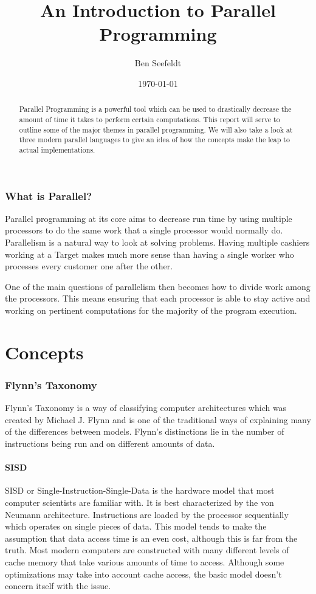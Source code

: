 \documentclass{article}
\author{Ben Seefeldt}
\title{An Introduction to Parallel Programming \\
		\small{\ver}}
\date{\today}
\begin{document}
\maketitle

\begin{abstract}
Parallel Programming is a powerful tool which can be used to drastically decrease the amount of time it takes to perform certain computations. This report will serve to outline some of the major themes in parallel programming. We will also take a look at three modern parallel languages to give an idea of how the concepts make the leap to actual implementations. 
\end{abstract}

  \section{What is Parallel?}
  Parallel programming at its core aims to decrease run time by using multiple processors to do the same work that a single processor would normally do. Parallelism is a natural way to look at solving problems. Having multiple cashiers working at a Target makes much more sense than having a single worker who processes every customer one after the other.
  
  One of the main questions of parallelism then becomes how to divide work among the processors. This means ensuring that each processor is able to stay active and working on pertinent computations for the majority of the program execution.

\part{Concepts}

  \section{Flynn's Taxonomy}
  Flynn's Taxonomy is a way of classifying computer architectures which was created by Michael J. Flynn and is one of the traditional ways of explaining many of the differences between models. Flynn's distinctions lie in the number of instructions being run and on different amounts of data.
    \subsection{SISD}
    SISD or Single-Instruction-Single-Data is the hardware model that most computer scientists are familiar with. It is best characterized by the von Neumann architecture. Instructions are loaded by the processor sequentially which operates on single pieces of data. This model tends to make the assumption that data access time is an even cost, although this is far from the truth. Most modern computers are constructed with many different levels of cache memory that take various amounts of time to access. Although some optimizations may take into account cache access, the basic model doesn't concern itself with the issue.
\end{document}
